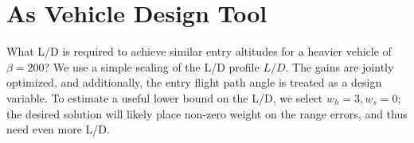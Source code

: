 \section{As Vehicle Design Tool}
What L/D is required to achieve similar entry altitudes for a heavier vehicle of $\beta=200$? We use a simple scaling of the L/D profile $L/D$. The gains are jointly optimized, and additionally, the entry flight path angle is treated as a design variable. To estimate a useful lower bound on the L/D, we select $w_h=3, w_s=0$; the desired solution will likely place non-zero weight on the range errors, and thus need even more L/D. 
